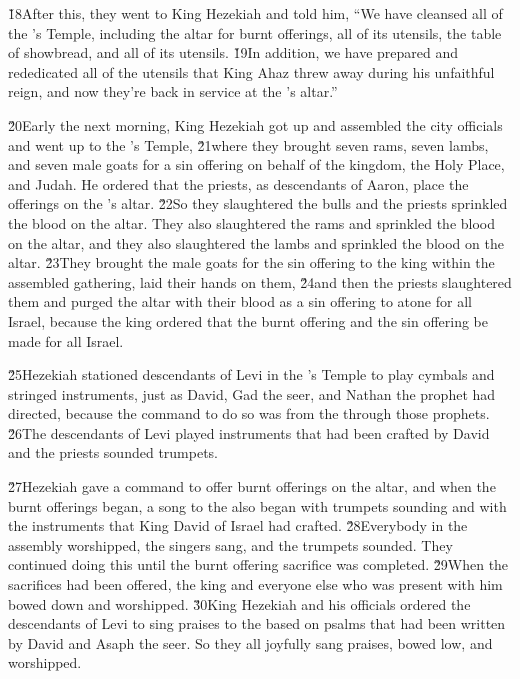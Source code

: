 \v{18}After this, they went to King Hezekiah and told him, ``We have cleansed all of the 's Temple, including the altar for burnt offerings, all of its utensils, the table of showbread, and all of its utensils. \v{19}In addition, we have prepared and rededicated all of the utensils that King Ahaz threw away during his unfaithful reign, and now they're back in service at the 's altar.''

\v{20}Early the next morning, King Hezekiah got up and assembled the city officials and went up to the 's Temple, \v{21}where they brought seven rams, seven lambs, and seven male goats for a sin offering on behalf of the kingdom, the Holy Place, and Judah. He ordered that the priests, as descendants of Aaron, place the offerings on the 's altar. \v{22}So they slaughtered the bulls and the priests sprinkled the blood on the altar. They also slaughtered the rams and sprinkled the blood on the altar, and they also slaughtered the lambs and sprinkled the blood on the altar. \v{23}They brought the male goats for the sin offering to the king within the assembled gathering, laid their hands on them, \v{24}and then the priests slaughtered them and purged the altar with their blood as a sin offering to atone for all Israel, because the king ordered that the burnt offering and the sin offering be made for all Israel.

\v{25}Hezekiah stationed descendants of Levi in the 's Temple to play cymbals and stringed instruments, just as David, Gad the seer, and Nathan the prophet had directed, because the command to do so was from the  through those prophets. \v{26}The descendants of Levi played instruments that had been crafted by David and the priests sounded trumpets.

\v{27}Hezekiah gave a command to offer burnt offerings on the altar, and when the burnt offerings began, a song to the  also began with trumpets sounding and with the instruments that King David of Israel had crafted. \v{28}Everybody in the assembly worshipped, the singers sang, and the trumpets sounded. They continued doing this until the burnt offering sacrifice was completed. \v{29}When the sacrifices had been offered, the king and everyone else who was present with him bowed down and worshipped. \v{30}King Hezekiah and his officials ordered the descendants of Levi to sing praises to the  based on psalms that had been written by David and Asaph the seer. So they all joyfully sang praises, bowed low, and worshipped.


